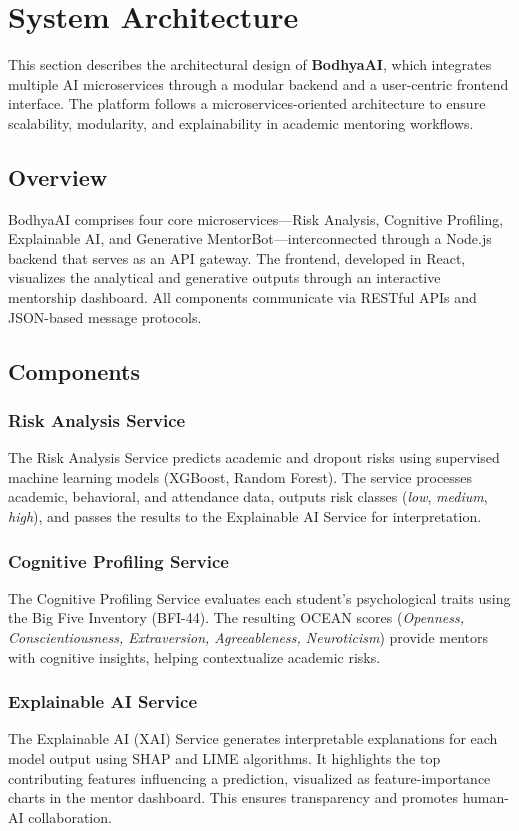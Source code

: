 \documentclass[conference]{IEEEtran}
\begin{document}
\section{System Architecture}
This section describes the architectural design of \textbf{BodhyaAI}, which integrates multiple AI microservices through a modular backend and a user-centric frontend interface. The platform follows a microservices-oriented architecture to ensure scalability, modularity, and explainability in academic mentoring workflows.

\subsection{Overview}
BodhyaAI comprises four core microservices—Risk Analysis, Cognitive Profiling, Explainable AI, and Generative MentorBot—interconnected through a Node.js backend that serves as an API gateway. The frontend, developed in React, visualizes the analytical and generative outputs through an interactive mentorship dashboard. All components communicate via RESTful APIs and JSON-based message protocols.

\subsection{Components}
\subsubsection{Risk Analysis Service}
The Risk Analysis Service predicts academic and dropout risks using supervised machine learning models (XGBoost, Random Forest). The service processes academic, behavioral, and attendance data, outputs risk classes (\textit{low}, \textit{medium}, \textit{high}), and passes the results to the Explainable AI Service for interpretation.

\subsubsection{Cognitive Profiling Service}
The Cognitive Profiling Service evaluates each student's psychological traits using the Big Five Inventory (BFI-44). The resulting OCEAN scores (\textit{Openness, Conscientiousness, Extraversion, Agreeableness, Neuroticism}) provide mentors with cognitive insights, helping contextualize academic risks.

\subsubsection{Explainable AI Service}
The Explainable AI (XAI) Service generates interpretable explanations for each model output using SHAP and LIME algorithms. It highlights the top contributing features influencing a prediction, visualized as feature-importance charts in the mentor dashboard. This ensures transparency and promotes human-AI collaboration.
\end{document}
